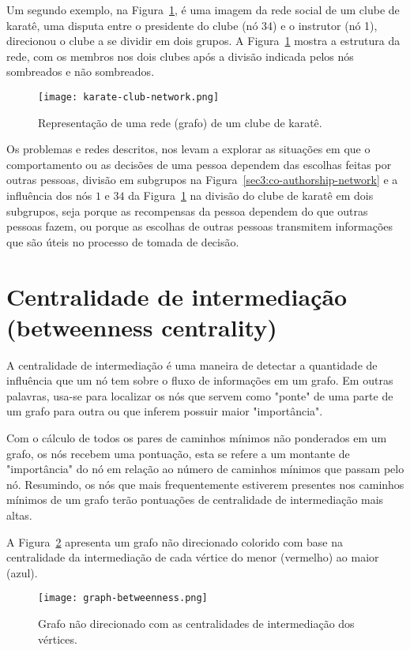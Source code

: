 Um segundo exemplo, na Figura~\ref{sec3:karate-club-network}, é uma imagem da rede social de um clube de karatê, uma disputa entre o presidente do clube (nó 34) e o instrutor (nó 1), direcionou o clube a se dividir em dois grupos. A Figura~\ref{sec3:karate-club-network} mostra a estrutura da rede, com os membros nos dois clubes após a divisão indicada pelos nós sombreados e não sombreados.

\begin{figure}[!htb]
    \centering
    \texttt{[image: karate-club-network.png]}
    \caption{Representação de uma rede (grafo) de um clube de karatê.}
    \label{sec3:karate-club-network}
\end{figure}

Os problemas e redes descritos, nos levam a explorar as situações em que o comportamento ou as decisões de uma pessoa dependem das escolhas feitas por outras pessoas, divisão em subgrupos na Figura~\ref{sec3:co-authorship-network} e a influência dos nós $1$ e $34$ da Figura~\ref{sec3:karate-club-network} na divisão do clube de karatê em dois subgrupos, seja porque as recompensas da pessoa dependem do que outras pessoas fazem, ou porque as escolhas de outras pessoas transmitem informações que são úteis no processo de tomada de decisão.


\section{Centralidade de intermediação (betweenness centrality)}
A centralidade de intermediação é uma maneira de detectar a quantidade de influência que um nó tem sobre o fluxo de informações em um grafo. Em outras palavras, usa-se para localizar os nós que servem como "ponte" de uma parte de um grafo para outra ou que inferem possuir maior "importância".

Com o cálculo de todos os pares de caminhos mínimos não ponderados em um grafo, os nós recebem uma pontuação, esta se refere a um montante de "importância" do nó em relação ao número de caminhos mínimos que passam pelo nó. Resumindo, os nós que mais frequentemente estiverem presentes nos caminhos mínimos de um grafo terão pontuações de centralidade de intermediação mais altas.

A Figura~\ref{sec3:graph-betweenness} apresenta um grafo não direcionado colorido com base na centralidade da intermediação de cada vértice do menor (vermelho) ao maior (azul).

\begin{figure}[!htb]
    \centering
    \texttt{[image: graph-betweenness.png]}
    \caption{Grafo não direcionado com as centralidades de intermediação dos vértices.}
    \label{sec3:graph-betweenness}
\end{figure}

